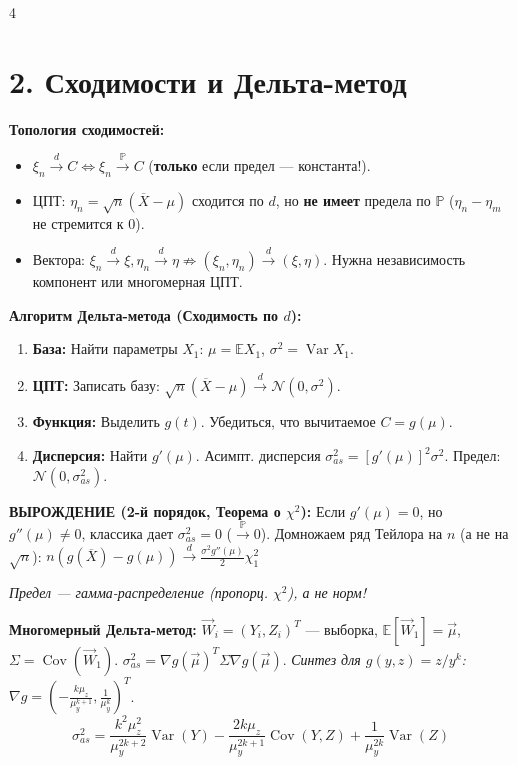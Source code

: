 \documentclass[a4paper, landscape]{article}
\newcommand{\E}{\mathbb{E}}
\renewcommand{\P}{\mathbb{P}}
\newcommand{\N}{\mathcal{N}}
\DeclareMathOperator{\Var}{Var}
\DeclareMathOperator{\Cov}{Cov}
\begin{document}
\begin{multicols*}{4}
\section*{2. Сходимости и Дельта-метод}
\textbf{Топология сходимостей:}
\begin{itemize}
    \item $\xi_n \xrightarrow{d} C \iff \xi_n \xrightarrow{\P} C$ (\textbf{только} если предел --- константа!).
    \item ЦПТ: $\eta_n = \sqrt{n}(\overline{X} - \mu)$ сходится по $d$, но \textbf{не имеет} предела по $\P$ ($\eta_n - \eta_m$ не стремится к $0$).
    \item Вектора: $\xi_n \xrightarrow{d} \xi, \eta_n \xrightarrow{d} \eta \not\Rightarrow (\xi_n, \eta_n) \xrightarrow{d} (\xi, \eta)$. Нужна независимость компонент или многомерная ЦПТ.
\end{itemize}

\textbf{Алгоритм Дельта-метода (Сходимость по $d$):}
\begin{enumerate}
    \item \textbf{База:} Найти параметры $X_1$: $\mu = \E X_1$, $\sigma^2 = \Var X_1$.
    \item \textbf{ЦПТ:} Записать базу: $\sqrt{n}(\overline{X} - \mu) \xrightarrow{d} \N(0, \sigma^2)$.
    \item \textbf{Функция:} Выделить $g(t)$. Убедиться, что вычитаемое $C = g(\mu)$.
    \item \textbf{Дисперсия:} Найти $g'(\mu)$. Асимпт. дисперсия $\sigma_{as}^2 = [g'(\mu)]^2 \sigma^2$. Предел: $\N(0, \sigma_{as}^2)$.
\end{enumerate}

\textbf{ВЫРОЖДЕНИЕ (2-й порядок, Теорема о $\chi^2$):}
Если $g'(\mu)=0$, но $g''(\mu)\ne 0$, классика дает $\sigma_{as}^2=0$ ($\xrightarrow{\P} 0$). Домножаем ряд Тейлора на $n$ (а не на $\sqrt{n}$):
$ n(g(\overline{X}) - g(\mu)) \xrightarrow{d} \frac{\sigma^2 g''(\mu)}{2} \chi^2_1 $

\textit{Предел — гамма-распределение (пропорц. $\chi^2$), а не норм!}

\textbf{Многомерный Дельта-метод:} $\vec{W}_i=(Y_i, Z_i)^T$ --- выборка, $\E[\vec{W}_1]=\vec{\mu}$, $\Sigma = \Cov(\vec{W}_1)$. $\sigma_{as}^2 = \nabla g(\vec{\mu})^T \Sigma \nabla g(\vec{\mu})$.
\textit{Синтез для $g(y,z) = z/y^k$:} $\nabla g = \left(-\frac{k\mu_z}{\mu_y^{k+1}}, \frac{1}{\mu_y^k}\right)^T$.
$$ \sigma^2_{as} \!=\! \frac{k^2 \mu_z^2}{\mu_y^{2k+2}} \Var(Y) - \frac{2k \mu_z}{\mu_y^{2k+1}} \Cov(Y, Z) + \frac{1}{\mu_y^{2k}} \Var(Z) $$


\end{multicols*}
\end{document}
